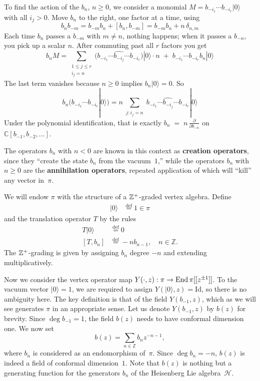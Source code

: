 \documentclass[12pt]{article}
\begin{document}
To find the action of the $b_n$, $n\ge 0$, we consider a monomial $M=b_{-i_1}\cdots b_{-i_r}|0\rangle$ with all $i_j>0$. Move $b_n$ to the right, one factor at a time, using
\[b_n b_{-m}=b_{-m} b_n + [b_n,b_{-m}]
= b_{-m} b_n + n\,\delta_{n,m}\]
Each time $b_n$ passes a $b_{-m}$ with $m\neq n$, nothing happens; when it passes a $b_{-n}$, you pick up a scalar $n$. After commuting past all $r$ factors you get
\[b_n M
= \sum_{\substack{1\le j\le r\\ i_j=n}}
\big(b_{-i_1}\cdots \widehat{b_{-i_j}}\cdots b_{-i_r}\big)|0\rangle
\cdot n \;+\; b_{-i_1}\cdots b_{-i_r} b_n|0\rangle\]
The last term vanishes because $n\ge0$ implies $b_n|0\rangle=0$. So
\[b_n\big(b_{-i_1}\cdots b_{-i_r}|0\rangle\big)
= n\sum_{\substack{j: i_j=n}}
b_{-i_1}\cdots \widehat{b_{-i_j}}\cdots b_{-i_r}|0\rangle\]
Under the polynomial identification, that is exactly
$b_n \;=\; n\,\frac{\partial}{\partial b_{-n}}$
on $\mathbb{C}[b_{-1},b_{-2},\dots]$.


The operators $b_n$ with $n<0$ are known in this context as \textbf{creation operators}, since they ``create the state $b_n$ from the vacuum~$1$,''
while the operators $b_n$ with $n\ge 0$ are the \textbf{annihilation operators}, repeated application of which will ``kill'' any vector in~$\pi$.

We will endow $\pi$ with the structure of a $\mathbb{Z}^+$-graded vertex algebra. Define \begin{align*}
    |0\rangle &\stackrel{\mathrm{def}}{=} 1 \in \pi
\end{align*} and the translation operator $T$ by the rules \begin{align*}
    T|0\rangle &\stackrel{\mathrm{def}}{=} 0 \\
    [T,b_n] &\stackrel{\mathrm{def}}{=} -n b_{n-1}, \quad n\in\mathbb{Z}.
\end{align*} The $\mathbb{Z}^+$-grading is given by assigning $b_n$ degree $-n$ and extending multiplicatively. 

Now we consider the vertex operator map $Y(\cdot,z): \pi \to \operatorname{End} \pi[[z^{\pm1}]]$. To the vacuum vector $\lvert 0 \rangle = 1$, we are required to assign $Y(\lvert 0 \rangle, z) = \mathrm{Id}$, so there is no ambiguity here. The key definition is that of the field $Y(b_{-1}, z)$, which as we will see generates $\pi$ in an appropriate sense.
Let us denote $Y(b_{-1}, z)$ by $b(z)$ for brevity.
Since $\deg b_{-1} = 1$, the field $b(z)$ needs to have conformal dimension one.
We now set
\[
b(z) = \sum_{n\in\mathbb{Z}} b_n z^{-n-1},
\]
where $b_n$ is considered as an endomorphism of~$\pi$.
Since $\deg b_n = -n$, $b(z)$ is indeed a field of conformal dimension~$1$.
Note that $b(z)$ is nothing but a generating function for the generators $b_n$ of the Heisenberg Lie algebra~$\mathcal{H}$.
\end{document}
